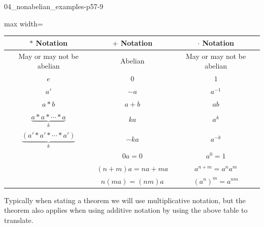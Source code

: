 \documentclass[11pt,oneside]{article}
\begin{document}
\begin{BookBody}
\begin{BookFloat}{04_nonabelian_examples-p57-9}
\begin{center}\begin{adjustbox}{max width=\linewidth}
\begin{tabular}{|c|c|c|}\hline
$\ast$ Notation & $+$ Notation & $\cdot$ Notation\\\hline
May or may not be abelian & Abelian & May or may not be abelian\\\hline
$e$ & $0$ & $1$\\\hline
$a'$ & $-a$ & $a^{-1}$\\\hline
$a\ast b$ & $a+b$ & $ab$\\\hline
$\underbrace{a\ast a\ast\cdots\ast a}_{k}$ & $ka$ & $a^k$\\\hline
$\underbrace{(a'\ast a'\ast\cdots\ast a')}_{k}$ & $-ka$ & $a^{-k}$\\\hline
& $0a=0$ & $a^0=1$\\\hline
& $(n+m)a=na+ma$ & $a^{n+m}=a^n a^m$\\\hline
& $n(ma)=(nm)a$ & $(a^n)^m=a^{nm}$\\\hline
\end{tabular}\end{adjustbox}\end{center}
\end{BookFloat}

Typically when stating a theorem we will use multiplicative notation, but the theorem also applies when using additive notation by using the above table to translate.

\end{BookBody}

\BookNarrativetrue
\end{document}
